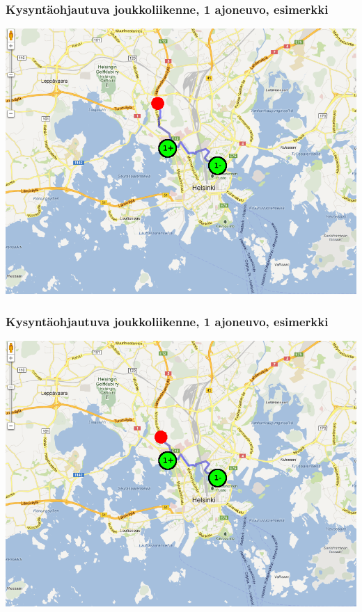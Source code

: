 \documentclass{beamer}
\begin{document}
            \begin{frame}
  \frametitle{Kysyntäohjautuva joukkoliikenne, 1 ajoneuvo, esimerkki}   %
\begin{center}
\includegraphics[scale=0.3]{ekademo03}
\end{center}
    \end{frame}
    
            \begin{frame}
  \frametitle{Kysyntäohjautuva joukkoliikenne, 1 ajoneuvo, esimerkki}   %
\begin{center}
\includegraphics[scale=0.3]{ekademo04}
\end{center}
    \end{frame}
    
\end{document}
